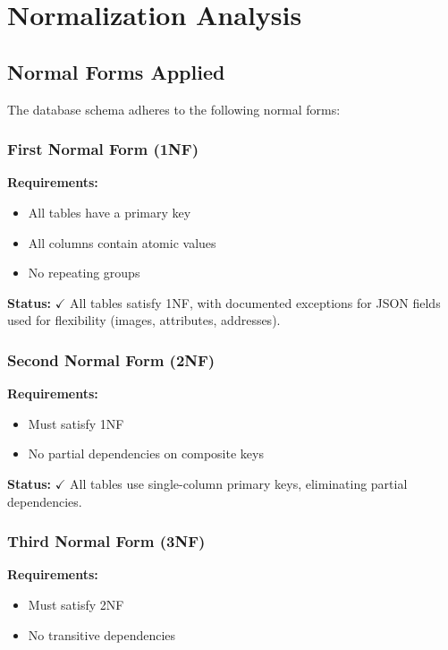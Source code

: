 \documentclass[12pt,a4paper]{report}
\begin{document}
\chapter{Normalization Analysis}

\section{Normal Forms Applied}

The database schema adheres to the following normal forms:

\subsection{First Normal Form (1NF)}

\textbf{Requirements:}
\begin{itemize}
    \item All tables have a primary key
    \item All columns contain atomic values
    \item No repeating groups
\end{itemize}

\textbf{Status:} $\checkmark$ All tables satisfy 1NF, with documented exceptions for JSON fields used for flexibility (images, attributes, addresses).

\subsection{Second Normal Form (2NF)}

\textbf{Requirements:}
\begin{itemize}
    \item Must satisfy 1NF
    \item No partial dependencies on composite keys
\end{itemize}

\textbf{Status:} $\checkmark$ All tables use single-column primary keys, eliminating partial dependencies.

\subsection{Third Normal Form (3NF)}

\textbf{Requirements:}
\begin{itemize}
    \item Must satisfy 2NF
    \item No transitive dependencies
\end{itemize}
\end{document}
